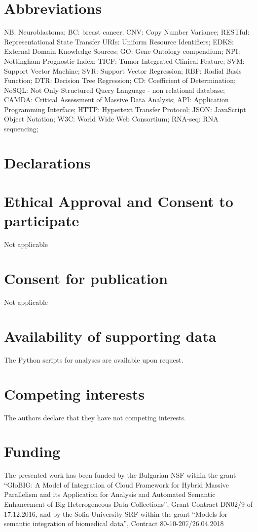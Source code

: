 \documentclass{bmcart}
\begin{document}

\begin{backmatter}

\section*{Abbreviations}
NB: Neuroblastoma; BC: breast cancer; CNV: Copy Number Variance; RESTful: Representational State Transfer
URIs: Uniform Resource Identifiers;  EDKS: External Domain Knowledge Sources; GO: Gene Ontology compendium;
NPI: Nottingham Prognostic Index;  TICF: Tumor Integrated Clinical Feature;  SVM: Support Vector Machine;
SVR: Support Vector Regression; RBF: Radial Basis Function; DTR: Decision Tree Regression; CD: Coefficient of Determination;
NoSQL: Not Only Structured Query Language - non relational database; CAMDA: Critical Assessment of Massive Data Analysis;
API: Application Programming Interface; HTTP: Hypertext Transfer Protocol; JSON:  JavaScript Object Notation;
W3C:  World Wide Web Consortium; RNA-seq: RNA sequencing;

\section*{Declarations}

\section*{Ethical Approval and Consent to participate}
Not applicable
\section*{Consent for publication}
Not applicable
\section*{Availability of supporting data}
The Python scripts for analyses are available upon request.
\section*{Competing interests}
The authors declare that they have not competing interests.
\section*{Funding}
The presented work has been funded by the Bulgarian NSF within the grant ``GloBIG: A
Model of Integration of Cloud Framework for Hybrid Massive Parallelism and its Application
for Analysis and Automated Semantic Enhancement of Big Heterogeneous Data Collections'',
Grant Contract DN02/9 of 17.12.2016, and by the Sofia University SRF within the grant
``Models for semantic integration of biomedical data'', Contract 80-10-207/26.04.2018


\end{backmatter}
\end{document}
